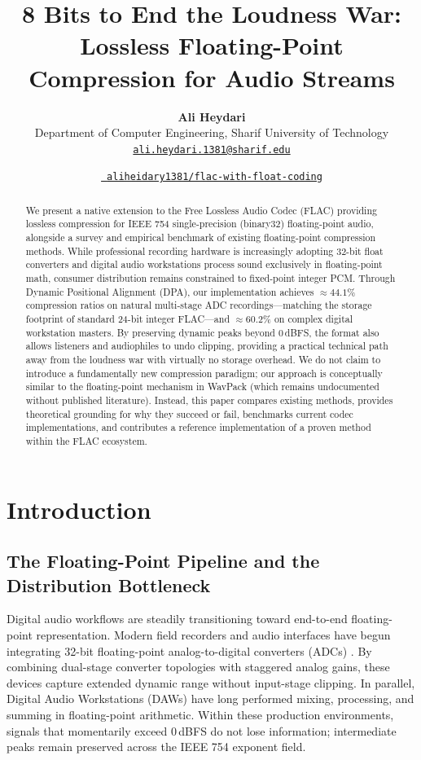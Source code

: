 \documentclass[10pt,twocolumn]{article}
\title{\textbf{8 Bits to End the Loudness War: Lossless Floating-Point Compression for Audio Streams}}
\author{%
	\textbf{Ali Heydari}\\
	\small Department of Computer Engineering, Sharif University of Technology\\
	\small \href{mailto:ali.heydari.1381@sharif.edu}{\texttt{ali.heydari.1381@sharif.edu}}%
}
\date{%
	\vspace{0.5ex}%
	\normalsize\href{https://github.com/aliheidary1381/flac-with-float-coding}{\raisebox{-0.05ex}{\faGithub}\ \texttt{aliheidary1381/flac-with-float-coding}}\\[-1.5ex]%
}
\begin{document}
\maketitle

\begin{abstract}
	We present a native extension to the Free Lossless Audio Codec (FLAC) providing lossless compression for IEEE 754 single-precision (binary32) floating-point audio, alongside a survey and empirical benchmark of existing floating-point compression methods. While professional recording hardware is increasingly adopting 32-bit float converters and digital audio workstations process sound exclusively in floating-point math, consumer distribution remains constrained to fixed-point integer PCM. Through Dynamic Positional Alignment (DPA), our implementation achieves $\approx 44.1\%$ compression ratios on natural multi-stage ADC recordings---matching the storage footprint of standard 24-bit integer FLAC---and $\approx 60.2\%$ on complex digital workstation masters. By preserving dynamic peaks beyond 0\,dBFS, the format also allows listeners and audiophiles to undo clipping, providing a practical technical path away from the loudness war with virtually no storage overhead. We do not claim to introduce a fundamentally new compression paradigm; our approach is conceptually similar to the floating-point mechanism in WavPack (which remains undocumented without published literature). Instead, this paper compares existing methods, provides theoretical grounding for why they succeed or fail, benchmarks current codec implementations, and contributes a reference implementation of a proven method within the FLAC ecosystem.
\end{abstract}

\section{Introduction}

\subsection{The Floating-Point Pipeline and the Distribution Bottleneck}
Digital audio workflows are steadily transitioning toward end-to-end floating-point representation. Modern field recorders and audio interfaces have begun integrating 32-bit floating-point analog-to-digital converters (ADCs) \cite{FloatRecording}. By combining dual-stage converter topologies with staggered analog gains, these devices capture extended dynamic range without input-stage clipping. In parallel, Digital Audio Workstations (DAWs) have long performed mixing, processing, and summing in floating-point arithmetic. Within these production environments, signals that momentarily exceed 0\,dBFS do not lose information; intermediate peaks remain preserved across the IEEE 754 exponent field.
\end{document}
